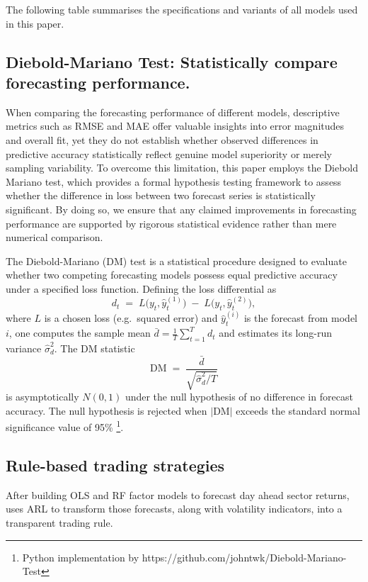 The following table summarises the specifications and variants of all models used in this paper.




\subsection{Diebold-Mariano Test: Statistically compare forecasting performance.}

When comparing the forecasting performance of different models, descriptive metrics such as RMSE and MAE offer valuable insights into error magnitudes and overall fit, yet they do not establish whether observed differences in predictive accuracy statistically reflect genuine model superiority or merely sampling variability. To overcome this limitation, this paper employs the Diebold Mariano test, which provides a formal hypothesis testing framework to assess whether the difference in loss between two forecast series is statistically significant. By doing so, we ensure that any claimed improvements in forecasting performance are supported by rigorous statistical evidence rather than mere numerical comparison.


The Diebold-Mariano (DM) test is a statistical procedure designed to evaluate whether two competing forecasting models possess equal predictive accuracy under a specified loss function.  Defining the loss differential as 
\[
d_t \;=\; L\bigl(y_t,\hat y^{(1)}_t\bigr)\;-\;L\bigl(y_t,\hat y^{(2)}_t\bigr),
\]
where \(L\) is a chosen loss (e.g.\ squared error) and \(\hat y^{(i)}_t\) is the forecast from model \(i\), one computes the sample mean \(\bar d = \frac{1}{T}\sum_{t=1}^T d_t\) and estimates its long-run variance \(\hat\sigma^2_d\).  The DM statistic
\[
\mathrm{DM} \;=\;\frac{\bar d}{\sqrt{\hat\sigma^2_d / T}}
\]
is asymptotically \(N(0,1)\) under the null hypothesis of no difference in forecast accuracy. The null hypothesis is rejected when \(\lvert\mathrm{DM}\rvert\) exceeds the standard normal significance value of 95\% \cite{dieman_2002} \footnote{Python implementation by https://github.com/johntwk/Diebold-Mariano-Test}.


\subsection{Rule-based trading strategies}
After building OLS and RF factor models to forecast day ahead sector returns,  uses ARL to transform those forecasts, along with volatility indicators, into a transparent trading rule. 

